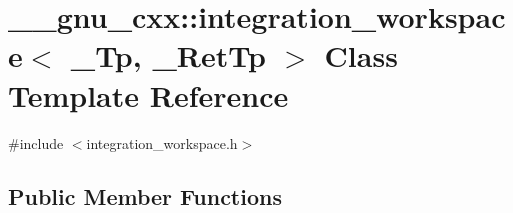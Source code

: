 \hypertarget{class____gnu__cxx_1_1integration__workspace}{}\section{\+\_\+\+\_\+gnu\+\_\+cxx\+:\+:integration\+\_\+workspace$<$ \+\_\+\+Tp, \+\_\+\+Ret\+Tp $>$ Class Template Reference}
\label{class____gnu__cxx_1_1integration__workspace}


{\ttfamily \#include $<$integration\+\_\+workspace.\+h$>$}

\subsection*{Public Member Functions}
